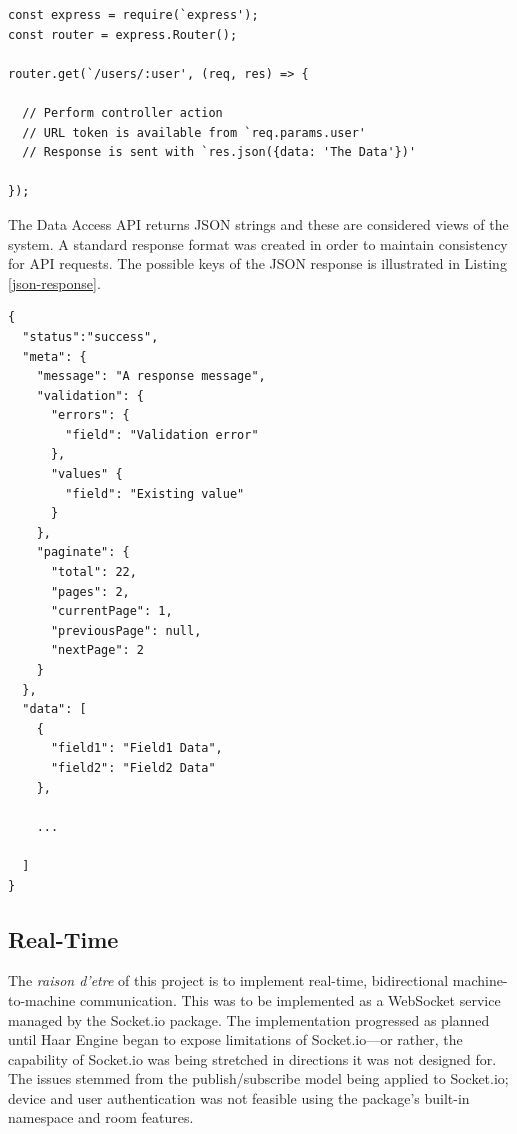       \begin{lstlisting}[caption=An example Express controller,
        label=express-route,
        captionpos=b,
        numbers=none,
        frame=single,
        float,
        upquote=true]
const express = require(`express');
const router = express.Router();

router.get(`/users/:user', (req, res) => {
  
  // Perform controller action
  // URL token is available from `req.params.user'
  // Response is sent with `res.json({data: 'The Data'})'

});
      \end{lstlisting}

      The Data Access API returns JSON strings and these are considered views of the system. A standard response format was created in order to maintain consistency for API requests. The possible keys of the JSON response is illustrated in Listing \ref{json-response}.
      
      \begin{lstlisting}[caption=The standard JSON format,
        label=json-response,
        captionpos=b,
        numbers=none,
        frame=single,
        float,
        upquote=true]
{
  "status":"success",
  "meta": {
    "message": "A response message",
    "validation": {
      "errors": {
        "field": "Validation error"
      },
      "values" {
        "field": "Existing value"
      }
    },
    "paginate": {
      "total": 22,
      "pages": 2,
      "currentPage": 1,
      "previousPage": null,
      "nextPage": 2
    }
  },
  "data": [
    {
      "field1": "Field1 Data",
      "field2": "Field2 Data"
    },

    ...

  ]
}
      \end{lstlisting}
    \subsection{Real-Time}
      The \textit{raison d'etre} of this project is to implement real-time, bidirectional machine-to-machine communication. This was to be implemented as a WebSocket service managed by the Socket.io package. The implementation progressed as planned until Haar Engine began to expose limitations of Socket.io---or rather, the capability of Socket.io was being stretched in directions it was not designed for. The issues stemmed from the publish/subscribe model being applied to Socket.io; device and user authentication was not feasible using the package's built-in namespace and room features.


